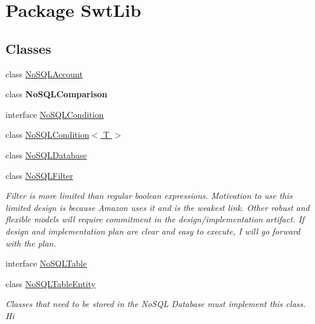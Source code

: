 \hypertarget{namespace_swt_lib}{\section{Package Swt\-Lib}
\label{namespace_swt_lib}
}
\subsection*{Classes}
\begin{DoxyCompactItemize}
\item 
class \hyperlink{class_swt_lib_1_1_no_s_q_l_account}{No\-S\-Q\-L\-Account}
\item 
class {\bfseries No\-S\-Q\-L\-Comparison}
\item 
interface \hyperlink{interface_swt_lib_1_1_no_s_q_l_condition}{No\-S\-Q\-L\-Condition}
\item 
class \hyperlink{class_swt_lib_1_1_no_s_q_l_condition_3_01_t_01_4}{No\-S\-Q\-L\-Condition$<$ T $>$}
\item 
class \hyperlink{class_swt_lib_1_1_no_s_q_l_database}{No\-S\-Q\-L\-Database}
\item 
class \hyperlink{class_swt_lib_1_1_no_s_q_l_filter}{No\-S\-Q\-L\-Filter}
\begin{DoxyCompactList}\small\item\em Filter is more limited than regular boolean expressions. Motivation to use this limited design is because Amazon uses it and is the weakest link. Other robust and flexible models will require commitment in the design/implementation artifact. If design and implementation plan are clear and easy to execute, I will go forward with the plan. \end{DoxyCompactList}\item 
interface \hyperlink{interface_swt_lib_1_1_no_s_q_l_table}{No\-S\-Q\-L\-Table}
\item 
class \hyperlink{class_swt_lib_1_1_no_s_q_l_table_entity}{No\-S\-Q\-L\-Table\-Entity}
\begin{DoxyCompactList}\small\item\em Classes that need to be stored in the No\-S\-Q\-L Database must implement this class.  Hi \end{DoxyCompactList}\end{DoxyCompactItemize}
